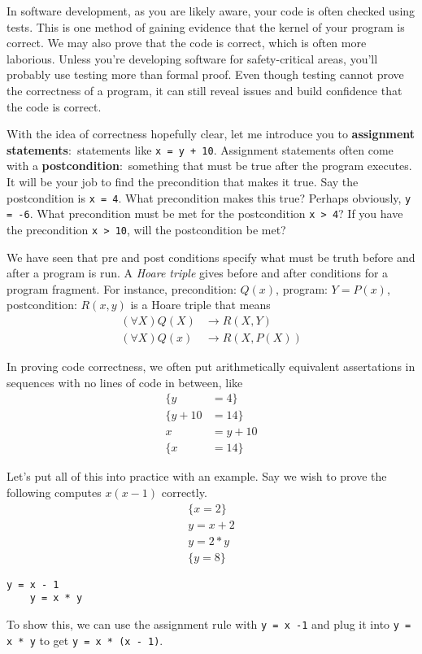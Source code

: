 \documentclass[nobib]{tufte-handout}
\newcommand{\defn}[2]{\noindent\textbf{#1}:\ #2}
\begin{document}
In software development, as you are likely aware, your code is often checked 
using tests. This is one method of gaining evidence that the kernel of your 
program is correct. We may also prove that the code is correct, which is 
often more laborious. Unless you're developing software for safety-critical 
areas, you'll probably use testing more than formal proof. Even though 
testing cannot prove the correctness of a program, it can still reveal issues
and build confidence that the code is correct. 

With the idea of correctness hopefully clear, let me introduce you to 
\defn{assignment statements}{statements like \texttt{x = y + 10}}. 
Assignment statements often come with a \defn{postcondition}{something 
that must be true after the program executes}. It will be your job to find 
the precondition that makes it true. Say the postcondition is 
\texttt{x = 4}. What precondition makes this true? Perhaps obviously, 
\texttt{y = -6}. What precondition must be met for the postcondition 
\texttt{x > 4}? If you have the precondition \texttt{x > 10}, will 
the postcondition be met? 

We have seen that pre and post conditions specify what must be truth
before and after a program is run. A \emph{Hoare triple} gives 
before and after conditions for a program fragment. For instance, 
precondition: $Q(x)$, program: $Y = P(x)$, postcondition: $R(x,y)$
is a Hoare triple that means 
\begin{align*}
    (\forall X) Q(X) &\rightarrow R(X,Y) \\
    (\forall X) Q(x) &\rightarrow R(X, P(X))
\end{align*}

In proving code correctness, we often put arithmetically equivalent 
assertations in sequences with no lines of code in between, like 
\begin{align*}
    \{y &= 4\} \\
    \{y + 10 &= 14\} \\
    x &= y + 10 \\
    \{x &= 14\}
\end{align*}

Let's put all of this into practice with an example. Say we 
wish to prove the following computes $x(x-1)$ correctly. 
\begin{align*}
    \{x = 2\} \\
    y = x + 2 \\
    y = 2*y \\
    \{y = 8\}
\end{align*}
\begin{lstlisting}[caption=Example]
    y = x - 1
    y = x * y
\end{lstlisting}
To show this, we can use the assignment rule with \texttt{y = x -1}
and plug it into \texttt{y = x * y} to get \texttt{y = x * (x - 1)}. 
\end{document}
